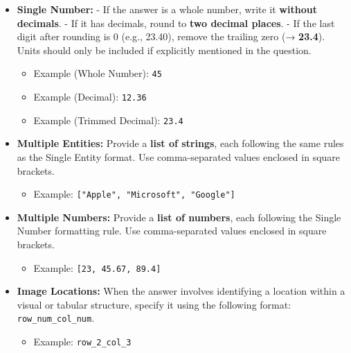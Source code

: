 \documentclass[11pt]{article}
\begin{document}
\begin{itemize}
    \item \textbf{Single Number:}  
    - If the answer is a whole number, write it \textbf{without decimals}.  
    \vspace{-0.2em}
    - If it has decimals, round to \textbf{two decimal places}.  \vspace{-0.2em}
    - If the last digit after rounding is 0 (e.g., 23.40), remove the trailing zero (→ \textbf{23.4}).  
    Units should only be included if explicitly mentioned in the question. 
    \vspace{-0.75em}
    \begin{itemize}
        \item Example (Whole Number): \texttt{45}  
        \vspace{-0.2em}
        \item Example (Decimal): \texttt{12.36} 
        \vspace{-0.2em}
        \item Example (Trimmed Decimal): \texttt{23.4}
        \vspace{-0.2em}
    \end{itemize}
    \vspace{-0.5em}
    \item \textbf{Multiple Entities:}  
    Provide a \textbf{list of strings}, each following the same rules as the Single Entity format.  
    Use comma-separated values enclosed in square brackets. 
    \vspace{-0.75em}
    \begin{itemize}
        \item Example: \texttt{["Apple", "Microsoft", "Google"]}
    \end{itemize}
    \vspace{-0.75em}
    \item \textbf{Multiple Numbers:}  
    Provide a \textbf{list of numbers}, each following the Single Number formatting rule.  
    Use comma-separated values enclosed in square brackets.  
    \vspace{-0.75em}
    \begin{itemize}
        \item Example: \texttt{[23, 45.67, 89.4]}
    \end{itemize}
    \vspace{-0.75em}
    \item \textbf{Image Locations:}  
    When the answer involves identifying a location within a visual or tabular structure, specify it using the following format:  
    \texttt{row\_num\_col\_num}.  
    \vspace{-0.75em}
    \begin{itemize}
        \item Example: \texttt{row\_2\_col\_3}
    \end{itemize}
\end{itemize}
\end{document}
